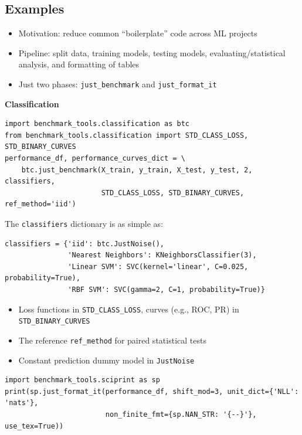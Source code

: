 \documentclass[a0,landscape]{a0poster}
\newcommand{\mysection}[1]{\section*{\fontsize{67.1}{82} \selectfont \color{NavyBlue} #1 \color{Black}}}
\newcommand{\code}{\texttt}
\newcommand{\sectionx}{\textbf}
\begin{document}
\begin{multicols}{2}

\Large

\mysection{Examples}

\begin{itemize}
  \item Motivation: reduce common ``boilerplate'' code across ML projects
  \item Pipeline: split data, training models, testing models, evaluating/statistical analysis, and formatting of tables
  \item Just two phases: \code{just\_benchmark} and \code{just\_format\_it}
\end{itemize}

\sectionx{Classification}
{\normalsize
\begin{verbatim}
import benchmark_tools.classification as btc
from benchmark_tools.classification import STD_CLASS_LOSS, STD_BINARY_CURVES
performance_df, performance_curves_dict = \
    btc.just_benchmark(X_train, y_train, X_test, y_test, 2, classifiers,
                       STD_CLASS_LOSS, STD_BINARY_CURVES, ref_method='iid')
\end{verbatim}
}
The \code{classifiers} dictionary is as simple as:
{\normalsize
\begin{verbatim}
classifiers = {'iid': btc.JustNoise(),
               'Nearest Neighbors': KNeighborsClassifier(3),
               'Linear SVM': SVC(kernel='linear', C=0.025, probability=True),
               'RBF SVM': SVC(gamma=2, C=1, probability=True)}
\end{verbatim}
}
\begin{itemize}
  \item Loss functions in \code{STD\_CLASS\_LOSS}, curves (e.g., ROC, PR) in \code{STD\_BINARY\_CURVES}
  \item The reference \code{ref\_method} for paired statistical tests
  \item Constant prediction dummy model in \code{JustNoise}
\end{itemize}
{\normalsize
\begin{verbatim}
import benchmark_tools.sciprint as sp
print(sp.just_format_it(performance_df, shift_mod=3, unit_dict={'NLL': 'nats'},
                        non_finite_fmt={sp.NAN_STR: '{--}'}, use_tex=True))
\end{verbatim}
}
\begin{center}
{\footnotesize
\setlength{\tabcolsep}{0.75em} %
\begin{tabular}{|l|l|r|l|r|l|r|l|r|l|r|l|r|l|r|}

\end{tabular}}
\end{center}
\end{multicols}
\end{document}
